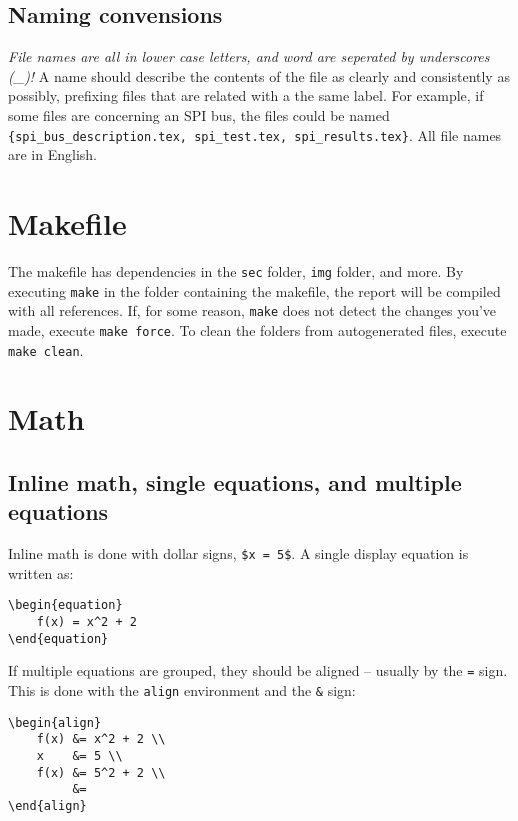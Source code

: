 \subsection{Naming convensions}
\emph{File names are all in lower case letters, and word are seperated by underscores (\_)!} A name should describe the contents of the file as clearly and consistently as possibly, prefixing files that are related with a the same label. For example, if some files are concerning an SPI bus, the files could be named \texttt{\{spi\_bus\_description.tex, spi\_test.tex, spi\_results.tex\}}. All file names are in English.


\section{Makefile} 
\label{sec:makefile}
The makefile has dependencies in the \texttt{sec} folder, \texttt{img} folder, and more. By executing \texttt{make} in the folder containing the makefile, the report will be compiled with all references. If, for some reason, \texttt{make} does not detect the changes you've made, execute \texttt{make force}. To clean the folders from autogenerated files, execute \texttt{make clean}.


\section{Math}
\label{sec:math}
\subsection{Inline math, single equations, and multiple equations}
Inline math is done with dollar signs, \texttt{\$x = 5\$}. A single display equation is written as:
\begin{verbatim}
\begin{equation}
    f(x) = x^2 + 2
\end{equation}
\end{verbatim}
If multiple equations are grouped, they should be aligned -- usually by the \texttt{=} sign. This is done with the \texttt{align} environment and the \texttt{\&} sign:
\begin{verbatim}
\begin{align}
    f(x) &= x^2 + 2 \\
    x    &= 5 \\
    f(x) &= 5^2 + 2 \\
         &= 
\end{align}
\end{verbatim}


